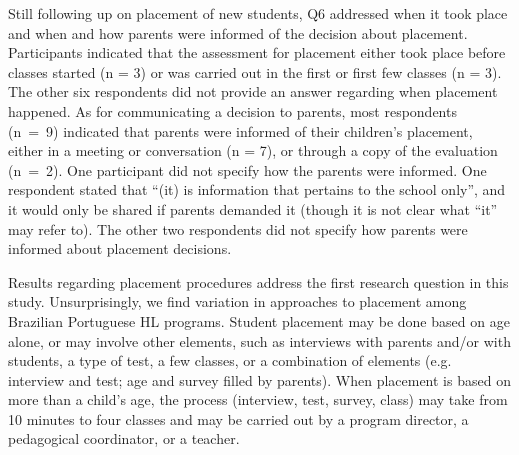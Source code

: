 \documentclass[output=paper]{langscibook}
\begin{document}
Still following up on placement of new students, Q6 addressed when it took place and when and how parents were informed of the decision about placement. Participants indicated that the assessment for placement either took place before classes started (n = 3) or was carried out in the first or first few classes (n = 3). The other six respondents did not provide an answer regarding when placement happened. As for communicating a decision to parents, most respondents (n~=~9) indicated that parents were informed of their children’s placement, either in a meeting or conversation (n = 7), or through a copy of the evaluation (n~=~2). One participant did not specify how the parents were informed. One respondent stated that “(it) is information that pertains to the school only”, and it would only be shared if parents demanded it (though it is not clear what “it” may refer to). The other two respondents did not specify how parents were informed about placement decisions.

Results regarding placement procedures address the first research question in this study. Unsurprisingly, we find variation in approaches to placement among Brazilian Portuguese HL programs. Student placement may be done based on age alone, or may involve other elements, such as interviews with parents and/or with students, a type of test, a few classes, or a combination of elements (e.g. interview and test; age and survey filled by parents). When placement is based on more than a child’s age, the process (interview, test, survey, class) may take from 10 minutes to four classes and may be carried out by a program director, a pedagogical coordinator, or a teacher.
\end{document}
